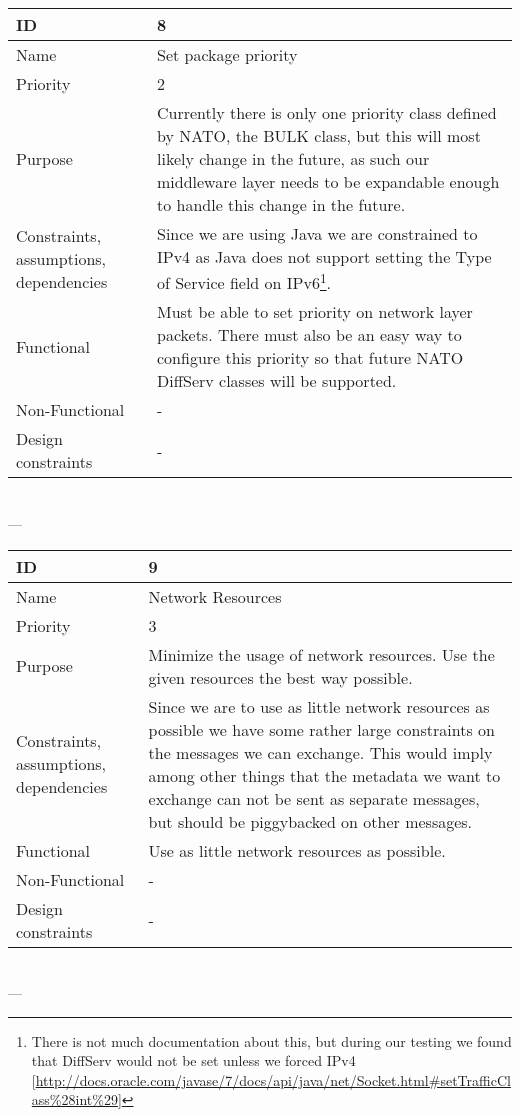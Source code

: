 \begin{center}
    \begin{tabular}{| p{4cm} | p{8cm} |}
        \hline
        ID & 8 \\
        \hline
        Name & Set package priority \\
        \hline
        Priority & 2 \\
        \hline
        Purpose & Currently there is only one priority class defined by NATO, the BULK class, but this will most likely change in the future, as such our middleware layer needs to be expandable enough to handle this change in the future. \\
        \hline 
        Constraints, assumptions, dependencies & Since we are using Java we are constrained to IPv4 as Java does not support setting the Type of Service field on IPv6\footnote{There is not much documentation about this, but during our testing we found that DiffServ would not be set unless we forced IPv4 [\url{http://docs.oracle.com/javase/7/docs/api/java/net/Socket.html#setTrafficClass\%28int\%29}]}.\\
        \hline  
        Functional & Must be able to set priority on network layer packets. There must also be an easy way to configure this priority so that future NATO DiffServ classes will be supported. \\
        \hline
        Non-Functional & -\\ 
        \hline
        Design constraints & - \\
        \hline
    \end{tabular}
    \\  ---  \\
    
    \begin{tabular}{| p{4cm} | p{8cm} |}
        \hline
        ID & 9 \\
        \hline
        Name & Network Resources \\
        \hline
        Priority & 3 \\
        \hline
        Purpose & Minimize the usage of network resources. Use the given resources the best way possible. \\
        \hline 
        Constraints, assumptions, dependencies & Since we are to use as little network resources as possible we have some rather large constraints on the messages we can exchange. This would imply among other things that the metadata we want to exchange can not be sent as separate messages, but should be piggybacked on other messages. \\
        \hline  
        Functional & Use as little network resources as possible.\\
        \hline
        Non-Functional & -\\ 
        \hline
        Design constraints & -\\
        \hline
    \end{tabular}
    \\  ---  \\
    

\end{center}
